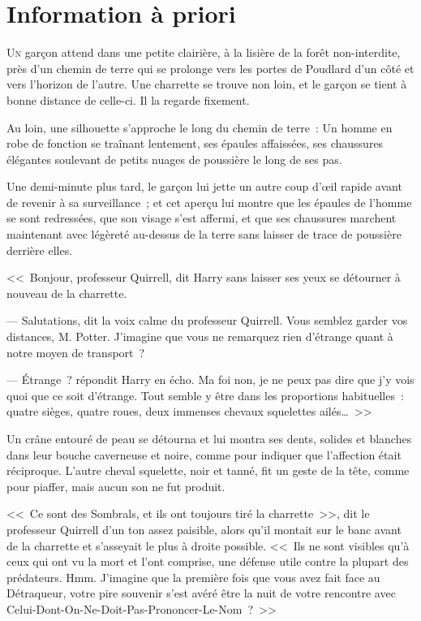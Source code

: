 \chapter{Information à priori}

\lettrine{U}{n} garçon attend dans une petite clairière, à la lisière de la forêt non-interdite, près d'un chemin de terre qui se prolonge vers les portes de Poudlard d'un côté et vers l'horizon de l'autre. Une charrette se trouve non loin, et le garçon se tient à bonne distance de celle-ci. Il la regarde fixement.

Au loin, une silhouette s'approche le long du chemin de terre~: Un homme en robe de fonction se traînant lentement, ses épaules affaissées, ses chaussures élégantes soulevant de petits nuages de poussière le long de ses pas.

Une demi-minute plus tard, le garçon lui jette un autre coup d'œil rapide avant de revenir à sa surveillance~; et cet aperçu lui montre que les épaules de l'homme se sont redressées, que son visage s'est affermi, et que ses chaussures marchent maintenant avec légèreté au-dessus de la terre sans laisser de trace de poussière derrière elles.

<<~Bonjour, professeur Quirrell, dit Harry sans laisser ses yeux se détourner à nouveau de la charrette.

--- Salutations, dit la voix calme du professeur Quirrell. Vous semblez garder vos distances, M. Potter. J'imagine que vous ne remarquez rien d'étrange quant à notre moyen de transport~?

--- Étrange~? répondit Harry en écho. Ma foi non, je ne peux pas dire que j'y vois quoi que ce soit d'étrange. Tout semble y être dans les proportions habituelles~: quatre sièges, quatre roues, deux immenses chevaux squelettes ailés…~>>

Un crâne entouré de peau se détourna et lui montra ses dents, solides et blanches dans leur bouche caverneuse et noire, comme pour indiquer que l'affection était réciproque. L'autre cheval squelette, noir et tanné, fit un geste de la tête, comme pour piaffer, mais aucun son ne fut produit.

<<~Ce sont des Sombrals, et ils ont toujours tiré la charrette~>>, dit le professeur Quirrell d'un ton assez paisible, alors qu'il montait sur le banc avant de la charrette et s'asseyait le plus à droite possible. <<~Ils ne sont visibles qu'à ceux qui ont vu la mort et l'ont comprise, une défense utile contre la plupart des prédateurs. Hmm. J'imagine que la première fois que vous avez fait face au Détraqueur, votre pire souvenir s'est avéré être la nuit de votre rencontre avec Celui-Dont-On-Ne-Doit-Pas-Prononcer-Le-Nom~?~>>

